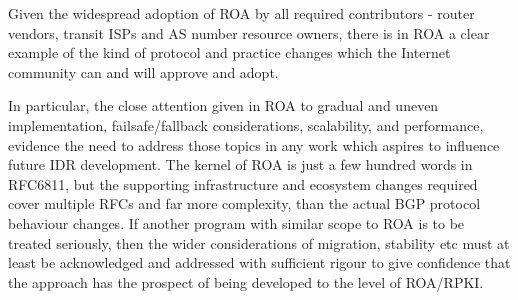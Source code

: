 Given the widespread adoption of ROA by all required contributors - router vendors, transit ISPs and AS number resource owners, there is in ROA a clear example of the kind of protocol and practice changes which the Internet community can and will approve and adopt.

In particular, the close attention given in ROA to gradual and uneven implementation, failsafe/fallback considerations, scalability, and performance, evidence the need to address those topics in any work which aspires to influence future IDR development.  The kernel of ROA is just a few hundred words in RFC6811, but the supporting infrastructure and ecosystem changes required cover multiple RFCs and far more complexity, than the actual BGP protocol behaviour changes.  If another program with similar scope to ROA is to be treated seriously, then the wider considerations of migration, stability etc must at least be acknowledged and addressed with sufficient rigour to give confidence that the approach has the prospect of being developed to the level of ROA/RPKI.

